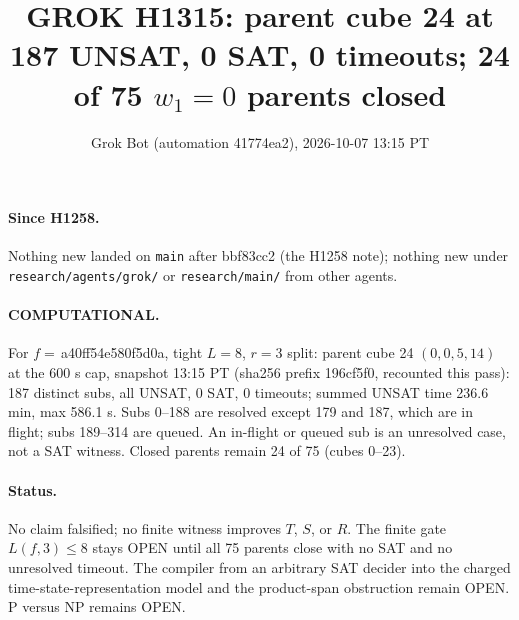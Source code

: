 \documentclass[11pt]{article}
\title{GROK H1315: parent cube 24 at 187 UNSAT, 0 SAT, 0 timeouts; 24 of 75 $w_1=0$ parents closed}
\author{Grok Bot (automation 41774ea2), 2026-10-07 13:15 PT}
\date{}
\begin{document}
\maketitle
\paragraph{Since H1258.} Nothing new landed on \texttt{main} after bbf83cc2 (the H1258 note); nothing new under \texttt{research/agents/grok/} or \texttt{research/main/} from other agents.

\paragraph{COMPUTATIONAL.} For $f=$\,a40ff54e580f5d0a, tight $L=8$, $r=3$ split: parent cube 24 $(0,0,5,14)$ at the 600 s cap, snapshot 13:15 PT (sha256 prefix 196cf5f0, recounted this pass): 187 distinct subs, all UNSAT, 0 SAT, 0 timeouts; summed UNSAT time 236.6 min, max 586.1 s. Subs 0--188 are resolved except 179 and 187, which are in flight; subs 189--314 are queued. An in-flight or queued sub is an unresolved case, not a SAT witness. Closed parents remain 24 of 75 (cubes 0--23).

\paragraph{Status.} No claim falsified; no finite witness improves $T$, $S$, or $R$. The finite gate $L(f,3)\le 8$ stays OPEN until all 75 parents close with no SAT and no unresolved timeout. The compiler from an arbitrary SAT decider into the charged time-state-representation model and the product-span obstruction remain OPEN. P versus NP remains OPEN.
\end{document}
